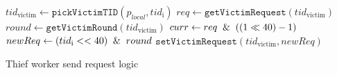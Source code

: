 \begin{algorithm}[bth]
\begin{algorithmic}[1]
    \STATE $tid_{\text{victim}} \gets \texttt{pickVictimTID}(p_{local}, tid_{\text{i}})$
    \STATE $req \gets \texttt{getVictimRequest}(tid_{\text{victim}})$
    \STATE $round \gets \texttt{getVictimRound}(tid_{\text{victim}})$
    \STATE $curr \gets req \And ((1\ll40)-1)$ 
        \STATE $newReq \gets (tid_{\text{i}}<<40) \And round$
        \STATE $\texttt{setVictimRequest}(tid_{\text{victim}}, newReq)$
    \ENDIF
\end{algorithmic}

\vspace{1ex}

\caption{Thief worker send request logic}
\label{algo:theif-logic}
\end{algorithm}

